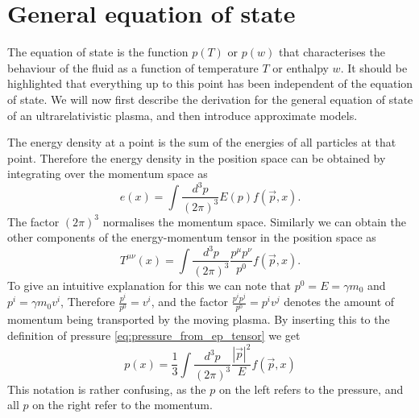 \section{General equation of state}
\label{general_eq}
The equation of state is the function $p(T)$ or $p(w)$ that characterises the behaviour of the fluid as a function of temperature $T$ or enthalpy $w$.
It should be highlighted that everything up to this point has been independent of the equation of state.
We will now first describe the derivation for the general equation of state of an ultrarelativistic plasma,
and then introduce approximate models.

\iffalse
In general the pressure of the ultrarelativistic ASDF
\begin{equation}
p(T,\phi) = - \sum_B f_B (m(\phi),T) - \sum_F f_F (m(\phi),T)
\end{equation}
\fi

The energy density at a point is the sum of the energies of all particles at that point.
Therefore the energy density in the position space can be obtained by integrating over the momentum space as
\cite[eq. 4.10]{lecture_notes}
\begin{equation}
e(x) = \int \frac{d^3 p}{(2 \pi)^3} E(p) f(\vec{p}, x).
\end{equation}
The factor $(2\pi)^3$ normalises the momentum space.
Similarly we can obtain the other components of the energy-momentum tensor in the position space as
\cite[eq. 4.13]{lecture_notes}
\begin{equation}
T^{\mu \nu}(x) = \int \frac{d^3 p}{(2 \pi)^3} \frac{p^\mu p^\nu}{p^0} f(\vec{p},x).
\end{equation}
To give an intuitive explanation for this we can note that $p^0 = E = \gamma m_0$ and $p^i = \gamma m_0 v^i$,
Therefore $\frac{p^i}{p^0} = v^i$,
and the factor $\frac{p^i p^j}{p^0} = p^i v^j$ denotes the amount of momentum being transported by the moving plasma.
By inserting this to the definition of pressure \eqref{eq:pressure_from_ep_tensor} we get
\begin{equation}
p(x) = \frac{1}{3} \int \frac{d^3 p}{(2 \pi)^3} \frac{|\vec{p}|^2}{E} f(\vec{p},x)
\end{equation}
This notation is rather confusing, as the $p$ on the left refers to the pressure,
and all $p$ on the right refer to the momentum.

